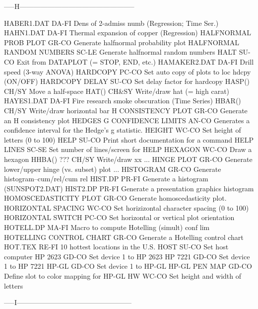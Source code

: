 -----H--------------------------------------------------

HABER1.DAT                  DA-FI Dens of 2-admiss numb (Regression; Time Ser.)
HAHN1.DAT                   DA-FI Thermal expansion of copper (Regression)
HALFNORMAL PROB PLOT        GR-CO Generate halfnormal probability plot
HALFNORMAL RANDOM NUMBERS   SC-LE Generate halfnormal random numbers
HALT                        SU-CO Exit from DATAPLOT (= STOP, END, etc.)
HAMAKER2.DAT                DA-FI Drill speed (3-way ANOVA)
HARDCOPY                    PC-CO Set auto copy of plots to loc hdcpy (ON/OFF)
HARDCOPY DELAY              SU-CO Set delay factor for hardcopy
HASP()                      CH/SY Move a half-space
HAT()                       CH&SY Write/draw hat (= high carat)
HAYES1.DAT                  DA-FI Fire research smoke obscuration (Time Series)
HBAR()                      CH/SY Write/draw horizontal bar
H CONSISTENCY PLOT          GR-CO Generate an H consistency plot
HEDGES G CONFIDENCE LIMITS  AN-CO Generates a confidence interval for the Hedge's g statistic.
HEIGHT                      WC-CO Set height of letters (0 to 100)
HELP                        SU-CO Print short documentation for a command
HELP LINES                  SC-SE Set number of lines/screen for HELP
HEXAGON                     WC-CO Draw a hexagon
HHBA()  ???                 CH/SY Write/draw xx
... HINGE PLOT              GR-CO Generate lower/upper hinge (vs. subset) plot
... HISTOGRAM               GR-CO Generate histogram--cum/rel/cum rel
HIST.DP                     PR-FI Generate a histogram (SUNSPOT2.DAT)
HIST2.DP                    PR-FI Generate a presentation graphics histogram
HOMOSCEDASTICITY PLOT       GR-CO Generate homoscedasticity plot.
HORIZONTAL SPACING          WC-CO Set horizizontal character spacing (0 to 100)
HORIZONTAL SWITCH           PC-CO Set horizontal or vertical plot orientation
HOTELL.DP                   MA-FI Macro to compute Hotelling (simult) conf lim
HOTELLING CONTROL CHART     GR-CO Generate a Hotelling control chart
HOT.TEX                     RE-FI 10 hottest locations in the U.S.
HOST                        SU-CO Set host computer
HP 2623                     GD-CO Set device 1 to HP 2623
HP 7221                     GD-CO Set device 1 to HP 7221
HP-GL                       GD-CO Set device 1 to HP-GL
HP-GL PEN MAP               GD-CO Define slot to color mapping for HP-GL
HW                          WC-CO Set height and width of letters

-----I--------------------------------------------------

